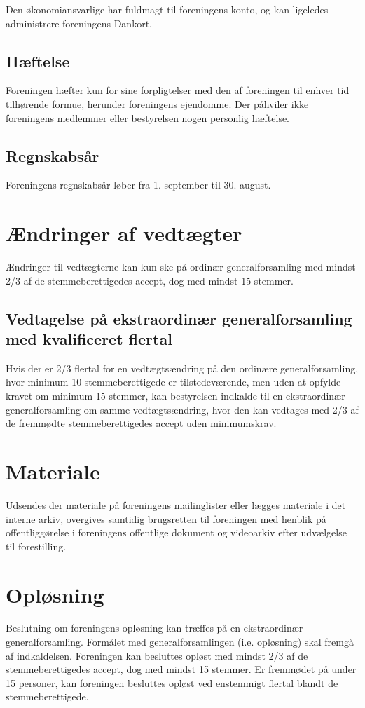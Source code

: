 \documentclass[a4paper,11pt,danish]{article}
\begin{document}
\noindent Den økonomiansvarlige har fuldmagt til foreningens konto, og kan
ligeledes administrere foreningens Dankort.

\subsection{Hæftelse}
Foreningen hæfter kun for sine forpligtelser med den af foreningen til enhver
tid tilhørende formue, herunder foreningens ejendomme. Der påhviler ikke
foreningens medlemmer eller bestyrelsen nogen personlig hæftelse.

\subsection{Regnskabsår}
Foreningens regnskabsår løber fra 1. september til 30. august.

\section{Ændringer af vedtægter}
Ændringer til vedtægterne kan kun ske på ordinær generalforsamling med mindst
2/3 af de stemmeberettigedes accept, dog med mindst 15 stemmer.

\subsection{Vedtagelse på ekstraordinær generalforsamling med kvalificeret
flertal}
Hvis der er 2/3 flertal for en vedtægtsændring på den ordinære
generalforsamling, hvor minimum 10 stemmeberettigede er tilstedeværende, men
uden at opfylde kravet om minimum 15 stemmer, kan bestyrelsen indkalde til en
ekstraordinær generalforsamling om samme vedtægtsændring, hvor den kan
vedtages med 2/3 af de fremmødte stemmeberettigedes accept uden minimumskrav.

\section{Materiale}
Udsendes der materiale på foreningens mailinglister eller lægges materiale i
det interne arkiv, overgives samtidig brugsretten til foreningen med henblik på
offentliggørelse i foreningens offentlige dokument og videoarkiv efter
udvælgelse til forestilling.

\section{Opløsning}
Beslutning om foreningens opløsning kan træffes på en ekstraordinær
generalforsamling. Formålet med generalforsamlingen (i.e. opløsning) skal
fremgå af indkaldelsen. Foreningen kan besluttes opløst med mindst 2/3 af de
stemmeberettigedes accept, dog med mindst 15 stemmer. Er fremmødet på under 15
personer, kan foreningen besluttes opløst ved enstemmigt flertal blandt de
stemmeberettigede.\\
\end{document}
